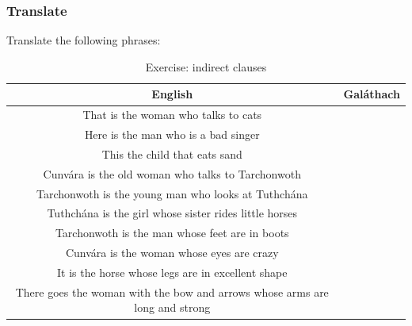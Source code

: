 \subsubsection{Translate}

Translate the following phrases:

\begin{table}[H]
\centering
\begin{tabular}{|c|M{5.0cm}|}
  \toprule
  \textbf{English} & \textbf{Gal\'{a}thach}\\
  \toprule
  That is the woman who talks to cats & \\
  \midrule
  Here is the man who is a bad singer & \\
  \midrule
  This the child that eats sand & \\
  \midrule
  Cunv\'{a}ra is the old woman who talks to Tarchonwoth & \\
  \midrule
  Tarchonwoth is the young man who looks at Tuthch\'{a}na & \\
  \midrule
  Tuthch\'{a}na is the girl whose sister rides little horses & \\
  \midrule
  Tarchonwoth is the man whose feet are in boots & \\
  \midrule
  Cunv\'{a}ra is the woman whose eyes are crazy & \\
  \midrule
  It is the horse whose legs are in excellent shape & \\
  \midrule
  There goes the woman with the bow and arrows whose arms are long and strong & \\
  \bottomrule
\end{tabular}
\label{exercise_indirect_clauses}
\caption{Exercise: indirect clauses}
\end{table}

\newpage
